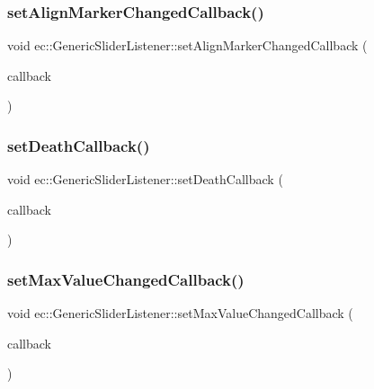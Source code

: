 \subsubsection{\texorpdfstring{set\+Align\+Marker\+Changed\+Callback()}{setAlignMarkerChangedCallback()}}
{\footnotesize\ttfamily void ec\+::\+Generic\+Slider\+Listener\+::set\+Align\+Marker\+Changed\+Callback (\begin{DoxyParamCaption}\item[{const \mbox{\hyperlink{classec_1_1_generic_slider_listener_a0b14e921e56b7dfc0a23af21f9921e0c}{Align\+Marker\+Changed\+\_\+\+Callback}} \&}]{callback }\end{DoxyParamCaption})}

\mbox{\label{classec_1_1_generic_slider_listener_a97f72024d5046bdc7f473830f43a531e}} 
\subsubsection{\texorpdfstring{set\+Death\+Callback()}{setDeathCallback()}}
{\footnotesize\ttfamily void ec\+::\+Generic\+Slider\+Listener\+::set\+Death\+Callback (\begin{DoxyParamCaption}\item[{const \mbox{\hyperlink{classec_1_1_generic_slider_listener_a73457456f87df632db463dbab48980ad}{Death\+\_\+\+Callback}} \&}]{callback }\end{DoxyParamCaption})}

\mbox{\label{classec_1_1_generic_slider_listener_acbec72068b224d414a26dab1d3351dc0}} 
\subsubsection{\texorpdfstring{set\+Max\+Value\+Changed\+Callback()}{setMaxValueChangedCallback()}}
{\footnotesize\ttfamily void ec\+::\+Generic\+Slider\+Listener\+::set\+Max\+Value\+Changed\+Callback (\begin{DoxyParamCaption}\item[{const \mbox{\hyperlink{classec_1_1_generic_slider_listener_a73ad440b637c2ce8b6f094702d9c3cf3}{Max\+Value\+Changed\+\_\+\+Callback}} \&}]{callback }\end{DoxyParamCaption})}

